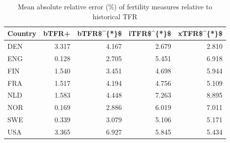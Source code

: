 \begin{table}[!h]
\centering
\caption{Mean absolute relative error (\%) of fertility measures relative to historical TFR}
\centering
\begin{tabular}[t]{lrrrr}
\toprule
Country & bTFR+ & bTFR\$\textasciicircum{}\{*\}\$ & iTFR\$\textasciicircum{}\{*\}\$ & xTFR\$\textasciicircum{}\{*\}\$\\
\midrule
DEN & 3.317 & 4.167 & 2.679 & 2.810\\
ENG & 0.128 & 2.705 & 5.451 & 6.918\\
FIN & 1.540 & 3.451 & 4.698 & 5.944\\
FRA & 1.517 & 4.194 & 4.756 & 5.109\\
NLD & 1.583 & 4.448 & 7.263 & 8.895\\
\addlinespace
NOR & 0.169 & 2.886 & 6.019 & 7.011\\
SWE & 0.339 & 3.079 & 5.106 & 5.171\\
USA & 3.365 & 6.927 & 5.845 & 5.434\\
\bottomrule
\end{tabular}
\end{table}
